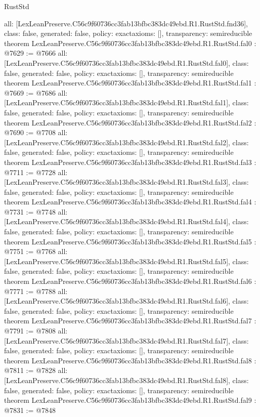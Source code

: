 \begin{lexlean}{RustStd}
\begin{coremodule}
{  all: [LexLeanPreserve.C56c9f60736cc3fab13bfbc383dc49ebd.R1.RustStd.fnd36],
  class: false,
  generated: false,
  policy: exact{axioms: []},
  transparency: semireducible
}
theorem LexLeanPreserve.C56c9f60736cc3fab13bfbc383dc49ebd.R1.RustStd.fal0 : @7629 := @7666 {
  all: [LexLeanPreserve.C56c9f60736cc3fab13bfbc383dc49ebd.R1.RustStd.fal0],
  class: false,
  generated: false,
  policy: exact{axioms: []},
  transparency: semireducible
}
theorem LexLeanPreserve.C56c9f60736cc3fab13bfbc383dc49ebd.R1.RustStd.fal1 : @7669 := @7686 {
  all: [LexLeanPreserve.C56c9f60736cc3fab13bfbc383dc49ebd.R1.RustStd.fal1],
  class: false,
  generated: false,
  policy: exact{axioms: []},
  transparency: semireducible
}
theorem LexLeanPreserve.C56c9f60736cc3fab13bfbc383dc49ebd.R1.RustStd.fal2 : @7690 := @7708 {
  all: [LexLeanPreserve.C56c9f60736cc3fab13bfbc383dc49ebd.R1.RustStd.fal2],
  class: false,
  generated: false,
  policy: exact{axioms: []},
  transparency: semireducible
}
theorem LexLeanPreserve.C56c9f60736cc3fab13bfbc383dc49ebd.R1.RustStd.fal3 : @7711 := @7728 {
  all: [LexLeanPreserve.C56c9f60736cc3fab13bfbc383dc49ebd.R1.RustStd.fal3],
  class: false,
  generated: false,
  policy: exact{axioms: []},
  transparency: semireducible
}
theorem LexLeanPreserve.C56c9f60736cc3fab13bfbc383dc49ebd.R1.RustStd.fal4 : @7731 := @7748 {
  all: [LexLeanPreserve.C56c9f60736cc3fab13bfbc383dc49ebd.R1.RustStd.fal4],
  class: false,
  generated: false,
  policy: exact{axioms: []},
  transparency: semireducible
}
theorem LexLeanPreserve.C56c9f60736cc3fab13bfbc383dc49ebd.R1.RustStd.fal5 : @7751 := @7768 {
  all: [LexLeanPreserve.C56c9f60736cc3fab13bfbc383dc49ebd.R1.RustStd.fal5],
  class: false,
  generated: false,
  policy: exact{axioms: []},
  transparency: semireducible
}
theorem LexLeanPreserve.C56c9f60736cc3fab13bfbc383dc49ebd.R1.RustStd.fal6 : @7771 := @7788 {
  all: [LexLeanPreserve.C56c9f60736cc3fab13bfbc383dc49ebd.R1.RustStd.fal6],
  class: false,
  generated: false,
  policy: exact{axioms: []},
  transparency: semireducible
}
theorem LexLeanPreserve.C56c9f60736cc3fab13bfbc383dc49ebd.R1.RustStd.fal7 : @7791 := @7808 {
  all: [LexLeanPreserve.C56c9f60736cc3fab13bfbc383dc49ebd.R1.RustStd.fal7],
  class: false,
  generated: false,
  policy: exact{axioms: []},
  transparency: semireducible
}
theorem LexLeanPreserve.C56c9f60736cc3fab13bfbc383dc49ebd.R1.RustStd.fal8 : @7811 := @7828 {
  all: [LexLeanPreserve.C56c9f60736cc3fab13bfbc383dc49ebd.R1.RustStd.fal8],
  class: false,
  generated: false,
  policy: exact{axioms: []},
  transparency: semireducible
}
theorem LexLeanPreserve.C56c9f60736cc3fab13bfbc383dc49ebd.R1.RustStd.fal9 : @7831 := @7848 {
}
\end{coremodule}
\end{lexlean}
